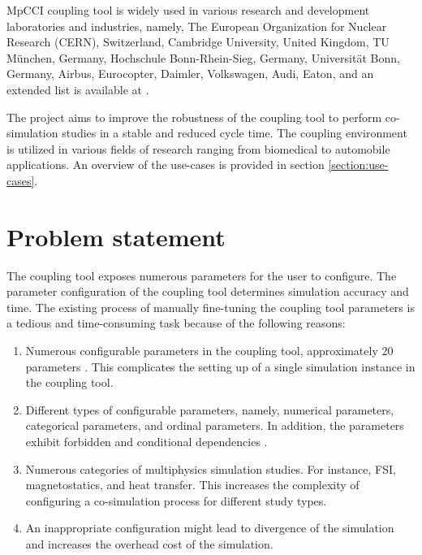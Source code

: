 MpCCI coupling tool is widely used in various research and development laboratories and industries, namely, The European Organization for Nuclear Research (CERN), Switzerland, Cambridge University, United Kingdom, TU München, Germany, Hochschule Bonn-Rhein-Sieg, Germany, Universität Bonn, Germany, Airbus, Eurocopter, Daimler, Volkswagen, Audi, Eaton, and an extended list is available at \cite{MpCCI_documentation_partners}. 

The project aims to improve the robustness of the coupling tool to perform co-simulation studies in a stable and reduced cycle time. The coupling environment is utilized in various fields of research ranging from biomedical to automobile applications. An overview of the use-cases is provided in section \ref{section:use-cases}.


\section{Problem statement}
The coupling tool exposes numerous parameters for the user to configure.  The parameter configuration of the coupling tool determines simulation accuracy and time. The existing process of manually fine-tuning the coupling tool parameters is a tedious and time-consuming task because of the following reasons:
 \begin{enumerate}
\item Numerous configurable parameters in the coupling tool, approximately 20 parameters \cite{MpCCI_documentation}. This complicates the setting up of a single simulation instance in the coupling tool.
\item Different types of configurable parameters, namely, numerical parameters, categorical parameters, and ordinal parameters. In addition, the parameters exhibit forbidden and conditional dependencies \cite{MpCCI_documentation}.
\item Numerous categories of multiphysics simulation studies. For instance, FSI, magnetostatics, and heat transfer. This increases the complexity of configuring a co-simulation process for different study types.
\item An inappropriate configuration might lead to divergence of the simulation and increases the overhead cost of the simulation.
 \end{enumerate}
 
